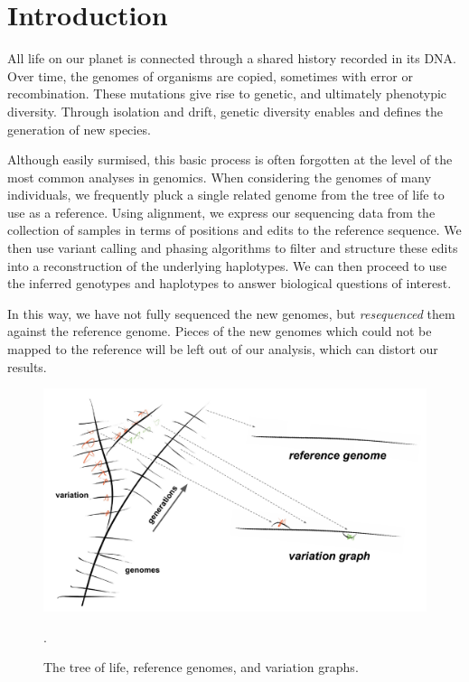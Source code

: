 
\chapter{Introduction}

\ifpdf
    \graphicspath{{Chapter1/Figs/Raster/}{Chapter1/Figs/PDF/}{Chapter1/Figs/}}
\else
    \graphicspath{{Chapter1/Figs/Vector/}{Chapter1/Figs/}}
\fi


All life on our planet is connected through a shared history recorded in its DNA.
Over time, the genomes of organisms are copied, sometimes with error or recombination.
These mutations give rise to genetic, and ultimately phenotypic diversity.
Through isolation and drift, genetic diversity enables and defines the generation of new species.

Although easily surmised, this basic process is often forgotten at the level of the most common analyses in genomics.
When considering the genomes of many individuals, we frequently pluck a single related genome from the tree of life to use as a reference.
Using alignment, we express our sequencing data from the collection of samples in terms of positions and edits to the reference sequence.
We then use variant calling and phasing algorithms to filter and structure these edits into a reconstruction of the underlying haplotypes.
We can then proceed to use the inferred genotypes and haplotypes to answer biological questions of interest.

In this way, we have not fully sequenced the new genomes, but \emph{resequenced} them against the reference genome.
Pieces of the new genomes which could not be mapped to the reference will be left out of our analysis, which can distort our results.

\begin{figure}[htbp!]
  \centering
  \includegraphics[width=1.0\textwidth]{Chapter1/Figs/phylogeny_and_vg.pdf}
  \caption{
    The tree of life, reference genomes, and variation graphs.
    } 
\label{fig:tree_of_life}.
\end{figure}

